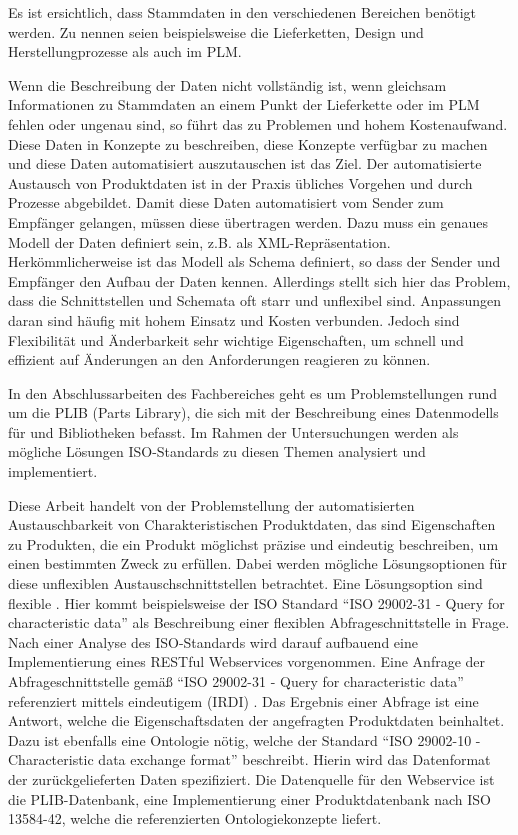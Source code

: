 Es ist ersichtlich, dass Stammdaten in den verschiedenen Bereichen benötigt werden. Zu nennen seien beispielsweise die Lieferketten, Design und Herstellungprozesse als auch im \gls{PLM}.     

Wenn die Beschreibung der Daten nicht vollständig ist, wenn gleichsam Informationen zu Stammdaten an einem Punkt der Lieferkette oder im \gls{PLM} fehlen oder ungenau sind, so führt das zu Problemen und hohem Kostenaufwand. 
Diese Daten in Konzepte zu beschreiben, diese Konzepte verfügbar zu machen und diese Daten automatisiert auszutauschen ist das Ziel. Der automatisierte Austausch von Produktdaten ist in der Praxis übliches Vorgehen und durch Prozesse abgebildet. Damit diese Daten automatisiert vom Sender zum Empfänger gelangen, müssen diese übertragen werden. Dazu muss ein genaues Modell der Daten definiert sein, z.B. als XML-Repräsentation. Herkömmlicherweise ist das Modell als Schema definiert, so dass der Sender und Empfänger den Aufbau der Daten kennen. Allerdings stellt sich hier das Problem, dass die Schnittstellen und Schemata oft starr und unflexibel sind. Anpassungen daran sind häufig mit hohem Einsatz und Kosten verbunden. Jedoch sind Flexibilität und Änderbarkeit sehr wichtige Eigenschaften, um schnell und effizient auf Änderungen an den Anforderungen reagieren zu können. 

In den Abschlussarbeiten des Fachbereiches geht es um Problemstellungen rund um die \gls{PLIB} (Parts Library), die sich mit der Beschreibung eines Datenmodells für  und Bibliotheken befasst. Im Rahmen der Untersuchungen werden als mögliche Lösungen ISO-Standards zu diesen Themen analysiert und implementiert. 

Diese Arbeit handelt von der Problemstellung der automatisierten Austauschbarkeit von Charakteristischen Produktdaten, das sind Eigenschaften zu Produkten, die ein Produkt möglichst präzise und eindeutig beschreiben, um einen bestimmten Zweck zu erfüllen. Dabei werden mögliche Lösungsoptionen für diese unflexiblen Austauschschnittstellen betrachtet. Eine Lösungsoption sind flexible . Hier kommt beispielsweise der ISO Standard \enquote{ISO 29002-31 - Query for characteristic data} als Beschreibung einer flexiblen \gls{Abfrageschnittstelle} in Frage. Nach einer Analyse des ISO-Standards wird darauf aufbauend eine Implementierung eines \gls{REST}ful \glspl{Webservice} vorgenommen. 
Eine Anfrage der \gls{Abfrageschnittstelle} gemäß \enquote{ISO 29002-31 - Query for characteristic data} referenziert mittels eindeutigem  (IRDI) . Das Ergebnis einer Abfrage ist eine Antwort, welche die Eigenschaftsdaten der angefragten Produktdaten beinhaltet. Dazu ist ebenfalls eine Ontologie nötig, welche der Standard \enquote{ISO 29002-10 - Characteristic data exchange format} beschreibt. Hierin wird das Datenformat der zurückgelieferten Daten spezifiziert. Die Datenquelle für den Webservice ist die PLIB-Datenbank, eine Implementierung einer Produktdatenbank nach ISO 13584-42, welche die referenzierten Ontologiekonzepte liefert. 

